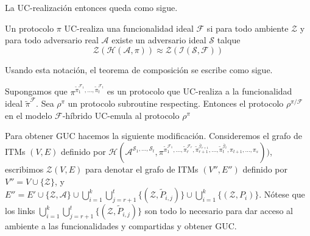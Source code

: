 La UC-realización entonces queda como sigue.

\begin{definicion}
Un protocolo $\pi$ UC-realiza una funcionalidad ideal $\mathcal{F}$ si para todo ambiente
$\mathcal{Z}$ y para todo adversario real $\mathcal{A}$ existe un adversario ideal $\mathcal{S}$
talque
$$\mathcal{Z}(\mathcal{H}(\mathcal{A},\pi))
\approx
\mathcal{Z}(\mathcal{I}(\mathcal{S},\mathcal{F}))$$
\end{definicion}

Usando esta notación, el teorema de composición se escribe como sigue.

\begin{teorema}
Supongamos que
$\pi^{
    \tilde{\pi}_1^{\mathcal{F}_1},
    \ldots,
    \tilde{\pi}_t^{\mathcal{F}_t}}$
es un protocolo que UC-realiza a la funcionalidad ideal $\tilde{\pi}^{\mathcal{F}}$. Sea $\rho^\pi$
un protocolo subroutine respecting. Entonces el protocolo
$\rho^{\pi/\mathcal{F}}$ en el modelo $\mathcal{F}$-híbrido UC-emula al protocolo $\rho^\pi$
\end{teorema}

Para obtener GUC hacemos la siguiente modificación. Consideremos el grafo de ITMs $(V, E)$ 
definido por
$\mathcal{H}(
    \mathcal{A}^{\mathcal{S}_1, \ldots, \mathcal{S}_t},
    \pi^{
        \tilde{\pi}_1^{\mathcal{F}_1},
        \ldots,
        \tilde{\pi}_r^{\mathcal{F}_r},
        \tilde{\pi}_{r+1}^{\bar{\mathcal{G}}_{r+1}},
        \ldots,
        \tilde{\pi}_t^{\bar{\mathcal{G}}_t},
        \pi_{t+1},
        \ldots,
        \pi_s}))$,
escribimos $\mathcal{Z}(V, E)$ para denotar el grafo de ITMs $(V'', E'')$ definido por $V'' = V \cup
\{\mathcal{Z}\}$, y $E'' = E' \cup \{\mathcal{Z}, \mathcal{A}\} \cup \bigcup_{i=1}^k
\bigcup_{j=r+1}^t \{(\mathcal{Z}, \tilde{P}_{i,j})\} \cup \bigcup_{i=1}^k \{(\mathcal{Z}, P_i)\}$.
Nótese que los links $\bigcup_{i=1}^k \bigcup_{j=r+1}^t \{(\mathcal{Z}, \tilde{P}_{i,j})\}$ son todo
lo necesario para dar acceso al ambiente a las funcionalidades y compartidas y obtener GUC.


